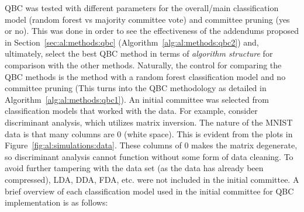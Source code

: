 \noindent QBC was tested with different parameters for the overall/main 
classification model (random forest vs majority committee vote) and committee 
pruning (yes or no). This was done in order to see the effectiveness of the 
addendums proposed in Section~\ref{sec:al:methods:qbc} 
(Algorithm~\ref{alg:al:methods:qbc2}) and, 
ultimately, select the best QBC method in terms of \textit{algorithm structure} 
for comparison with the other methods. Naturally, the control for comparing the 
QBC methods is the method with a random forest classification model and no 
committee pruning (This turns into the QBC methodology as detailed in 
Algorithm~\ref{alg:al:methods:qbc1}). An initial committee was selected from 
classification models that worked with the data. 
For example, consider discriminant analysis, which utilizes matrix inversion. 
The nature of the MNIST data is that many columns are 0 (white space). This is 
evident from the plots in Figure~\ref{fig:al:simulations:data}. These columns 
of 0 makes the matrix degenerate, so discriminant analysis cannot function 
without some form of data cleaning. 
To avoid further tampering with the data set (as the data has already been 
compressed), LDA, DDA, FDA, etc. were not included in the initial committee. 
A brief overview of each classification model used in the initial committee 
for QBC implementation is as follows:

